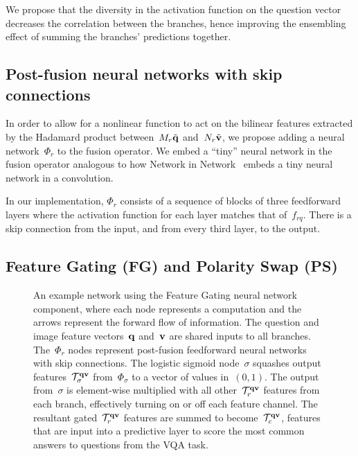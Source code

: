 We propose that the diversity in the activation function on the question vector
decreases the correlation between the branches, hence improving the ensembling
effect of summing the branches' predictions together.


\subsection{Post-fusion neural networks with skip connections}

In order to allow for a nonlinear function to act on the bilinear features
extracted by the Hadamard product between~$M_r\tilde{\mathbf{q}}$
and~$N_r\tilde{\mathbf{v}}$, we propose adding a neural network~$\Phi_r$ to the
fusion operator. We embed a ``tiny'' neural network in the fusion operator
analogous to how Network in Network~\cite{lin2013network} embeds a tiny neural
network in a convolution.

In our implementation, $\Phi_r$ consists of a sequence of blocks of three
feedforward layers where the activation function for each layer matches that
of~$f_{rq}$.  There is a skip connection from the input, and from every third
layer, to the output.


\subsection{Feature Gating (FG) and Polarity Swap (PS)}

\begin{figure*}[!t]
\centering

\caption{An example network using the Feature Gating neural
         network component, where each node represents a computation and
         the arrows represent the forward flow of information. The question and
         image feature vectors~$\mathbf{q}$ and~$\mathbf{v}$ are shared inputs to all branches.
         The~$\Phi_r$ nodes represent post-fusion feedforward neural networks
         with skip connections. The logistic sigmoid node~$\sigma$ squashes
         output features~$\mathcal{T}_\sigma^{\mathbf{q}{}\mathbf{v}{}}$ from~$\Phi_\sigma$ to a vector
         of values in~$(0, 1)$. The output from~$\sigma$ is element-wise
         multiplied with all other~$\mathcal{T}_r^{\mathbf{q}{}\mathbf{v}{}}$ features from each branch,
         effectively turning on or off each feature channel. The resultant
         gated~$\mathcal{T}_r^{\mathbf{q}{}\mathbf{v}{}}$ features are summed to become~$\mathcal{T}_c^{\mathbf{q}{}\mathbf{v}{}}$,
         features that are input into a predictive layer to score the most
         common answers to questions from the VQA task.}
\label{fig:feature-gating}
\end{figure*}

